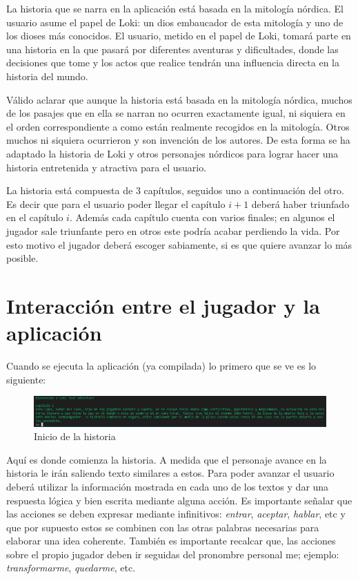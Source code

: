 \documentclass[12pt]{article}
\begin{document}
La historia que se narra en la aplicación está basada en la mitología nórdica. El usuario asume el papel de Loki: un dios embaucador de esta mitología y uno de los dioses más conocidos. El usuario, metido en el papel de Loki, tomará parte en una historia en la que pasará por diferentes aventuras y dificultades, donde las decisiones que tome y los actos que realice tendrán una influencia directa en la historia del mundo.

Válido aclarar que aunque la historia está basada en la mitología nórdica, muchos de los pasajes que en ella se narran no ocurren exactamente igual, ni siquiera en el orden correspondiente a como están realmente recogidos en la mitología. Otros muchos ni siquiera ocurrieron y son invención de los autores. De esta forma se ha adaptado la historia de Loki y otros personajes nórdicos para lograr hacer una historia entretenida y atractiva para el usuario.

La historia está compuesta de 3 capítulos, seguidos uno a continuación del otro. Es decir que para el usuario poder llegar el capítulo $i+1$ deberá haber triunfado en el capítulo $i$. Además cada capítulo cuenta con varios finales; en algunos el jugador sale triunfante pero en otros este podría acabar perdiendo la vida. Por esto motivo el jugador deberá escoger sabiamente, si es que quiere avanzar lo más posible.  

\section{Interacción entre el jugador y la aplicación}

Cuando se ejecuta la aplicación (ya compilada) lo primero que se ve es lo siguiente:

\begin{figure}[h]
	\begin{center}
		\includegraphics[width =15.0cm]{./img/Inicial.png}

        \caption{Inicio de la historia \label{fig:init}}
	\end{center}
\end{figure}

Aquí es donde comienza la historia. A medida que el personaje avance en la historia le irán saliendo texto similares a estos. Para poder avanzar el usuario deberá utilizar la información mostrada en cada uno de los textos y dar una respuesta lógica y bien escrita mediante alguna acción. Es importante señalar que las acciones se deben expresar mediante infinitivos: \textit{entrar}, \textit{aceptar}, \textit{hablar}, etc y que por supuesto estos se combinen con las otras palabras necesarias para elaborar una idea coherente. También es importante recalcar que, las acciones sobre el propio jugador deben ir seguidas del pronombre personal me; ejemplo: \textit{transformarme}, \textit{quedarme}, etc.
\end{document}
